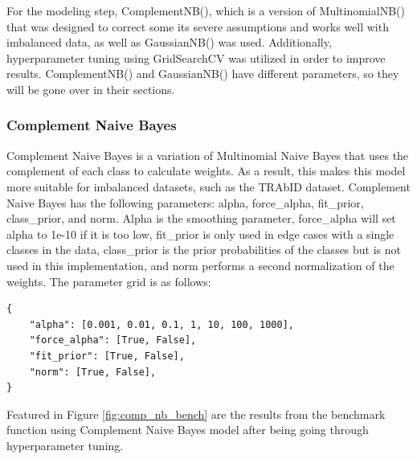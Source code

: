 For the modeling step, ComplementNB(), which is a version of MultinomialNB() that was designed to correct some its severe assumptions and works well with imbalanced data, as well as GaussianNB() was used. Additionally, hyperparameter tuning using GridSearchCV was utilized in order to improve results. ComplementNB() and GaussianNB() have different parameters, so they will be gone over in their sections.

\subsubsection{Complement Naive Bayes}
Complement Naive Bayes is a variation of Multinomial Naive Bayes that uses the complement of each class to calculate weights. As a result, this makes this model more suitable for imbalanced datasets, such as the TRAbID dataset. Complement Naive Bayes has the following parameters: alpha, force\_alpha, fit\_prior, class\_prior, and norm. Alpha is the smoothing parameter, force\_alpha will set alpha to 1e-10 if it is too low, fit\_prior is only used in edge cases with a single classes in the data, class\_prior is the prior probabilities of the classes but is not used in this implementation, and norm performs a second normalization of the weights. The parameter grid is as follows: 

\begin{lstlisting}
{
    "alpha": [0.001, 0.01, 0.1, 1, 10, 100, 1000],
    "force_alpha": [True, False],
    "fit_prior": [True, False],
    "norm": [True, False],
}
\end{lstlisting}

Featured in Figure \ref{fig:comp_nb_bench} are the results from the benchmark function using Complement Naive Bayes model after being going through hyperparameter tuning.

